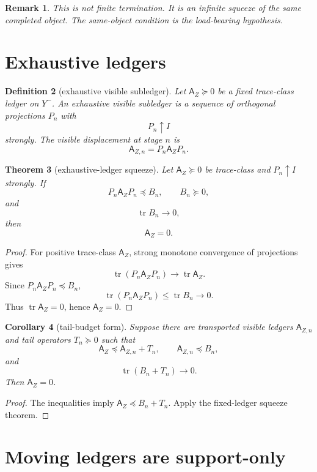 \documentclass[11pt]{article}
\newtheorem{theorem}{Theorem}[section]
\newtheorem{corollary}[theorem]{Corollary}
\newtheorem{definition}[theorem]{Definition}
\newtheorem{remark}[theorem]{Remark}
\newcommand{\AZ}{\mathsf A_Z}
\newcommand{\tr}{\operatorname{tr}}
\begin{document}
\begin{remark}
This is not finite termination.  It is an infinite squeeze of the same completed object.  The same-object condition is the load-bearing hypothesis.
\end{remark}

\section{Exhaustive ledgers}

\begin{definition}[exhaustive visible subledger]
Let \(\AZ\succeq0\) be a fixed trace-class ledger on \(Y^-\).  An exhaustive visible subledger is a sequence of orthogonal projections \(P_n\) with
\[
    P_n\uparrow I
\]
strongly.  The visible displacement at stage \(n\) is
\[
    \mathsf A_{Z,n}=P_n\AZ P_n.
\]
\end{definition}

\begin{theorem}[exhaustive-ledger squeeze]
Let \(\AZ\succeq0\) be trace-class and \(P_n\uparrow I\) strongly.  If
\[
    P_n\AZ P_n\preceq B_n,
    \qquad B_n\succeq0,
\]
and
\[
    \tr B_n\to0,
\]
then
\[
    \AZ=0.
\]
\end{theorem}

\begin{proof}
For positive trace-class \(\AZ\), strong monotone convergence of projections gives
\[
    \tr(P_n\AZ P_n)\to\tr\AZ.
\]
Since \(P_n\AZ P_n\preceq B_n\),
\[
    \tr(P_n\AZ P_n)\le \tr B_n\to0.
\]
Thus \(\tr\AZ=0\), hence \(\AZ=0\).
\end{proof}

\begin{corollary}[tail-budget form]
Suppose there are transported visible ledgers \(\mathsf A_{Z,n}\) and tail operators \(T_n\succeq0\) such that
\[
   \AZ\preceq \mathsf A_{Z,n}+T_n,
   \qquad
   \mathsf A_{Z,n}\preceq B_n,
\]
and
\[
   \tr(B_n+T_n)\to0.
\]
Then \(\AZ=0\).
\end{corollary}

\begin{proof}
The inequalities imply \(\AZ\preceq B_n+T_n\).  Apply the fixed-ledger squeeze theorem.
\end{proof}

\section{Moving ledgers are support-only}
\end{document}
